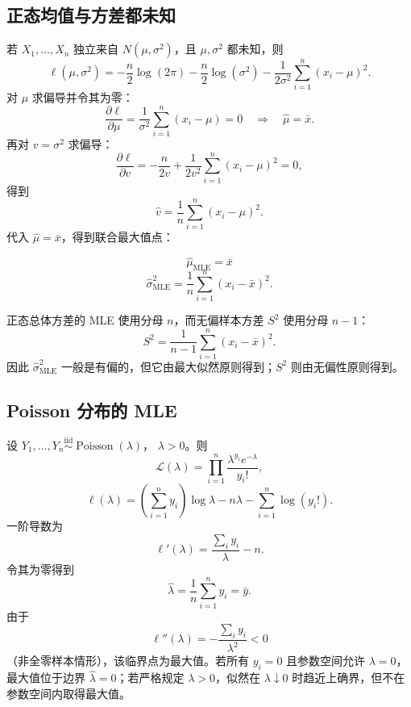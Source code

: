 \documentclass[11pt,a4paper]{article}
\theoremstyle{definition}
\theoremstyle{plain}
\theoremstyle{remark}
\begin{document}
\subsection{正态均值与方差都未知}

若 $X_1,\ldots,X_n$ 独立来自 $N(\mu,\sigma^2)$，且 $\mu,\sigma^2$ 都未知，则
\[
    \ell(\mu,\sigma^2)
    =
    -\frac n2\log(2\pi)
    -\frac n2\log(\sigma^2)
    -\frac{1}{2\sigma^2}\sum_{i=1}^n(x_i-\mu)^2.
\]
对 $\mu$ 求偏导并令其为零：
\[
    \frac{\partial\ell}{\partial\mu}
    =
    \frac{1}{\sigma^2}\sum_{i=1}^n(x_i-\mu)=0
    \quad\Longrightarrow\quad
    \hat\mu=\bar x.
\]
再对 $v=\sigma^2$ 求偏导：
\[
    \frac{\partial\ell}{\partial v}
    =
    -\frac{n}{2v}
    +\frac{1}{2v^2}\sum_{i=1}^n(x_i-\mu)^2=0,
\]
得到
\[
    \hat v=\frac1n\sum_{i=1}^n(x_i-\mu)^2.
\]
代入 $\hat\mu=\bar x$，得到联合最大值点：

\begin{memorybox}
\[
    \boxed{
    \hat\mu_{\mathrm{MLE}}=\bar x
    }
\]
\[
    \boxed{
    \hat\sigma^2_{\mathrm{MLE}}
    =
    \frac{1}{n}\sum_{i=1}^n(x_i-\bar x)^2.
    }
\]
\end{memorybox}

\begin{warnbox}
正态总体方差的 MLE 使用分母 $n$，而无偏样本方差 $S^2$ 使用分母 $n-1$：
\[
    S^2=\frac{1}{n-1}\sum_{i=1}^n(x_i-\bar x)^2.
\]
因此 $\hat\sigma^2_{\mathrm{MLE}}$ 一般是有偏的，但它由最大似然原则得到；$S^2$ 则由无偏性原则得到。
\end{warnbox}

\subsection{Poisson 分布的 MLE}

设 $Y_1,\ldots,Y_n\overset{\mathrm{iid}}{\sim}\operatorname{Poisson}(\lambda)$，
$\lambda>0$。则
\[
    \mathcal L(\lambda)
    =
    \prod_{i=1}^n\frac{\lambda^{y_i}e^{-\lambda}}{y_i!},
\]
\[
    \ell(\lambda)
    =
    \left(\sum_{i=1}^n y_i\right)\log\lambda
    -n\lambda
    -\sum_{i=1}^n\log(y_i!).
\]
一阶导数为
\[
    \ell'(\lambda)
    =
    \frac{\sum_i y_i}{\lambda}-n.
\]
令其为零得到
\[
    \hat\lambda=\frac{1}{n}\sum_{i=1}^n y_i=\bar y.
\]
由于
\[
    \ell''(\lambda)=-\frac{\sum_i y_i}{\lambda^2}<0
\]
（非全零样本情形），该临界点为最大值。若所有 $y_i=0$ 且参数空间允许
$\lambda=0$，最大值位于边界 $\hat\lambda=0$；若严格规定 $\lambda>0$，似然在
$\lambda\downarrow0$ 时趋近上确界，但不在参数空间内取得最大值。
\end{document}
